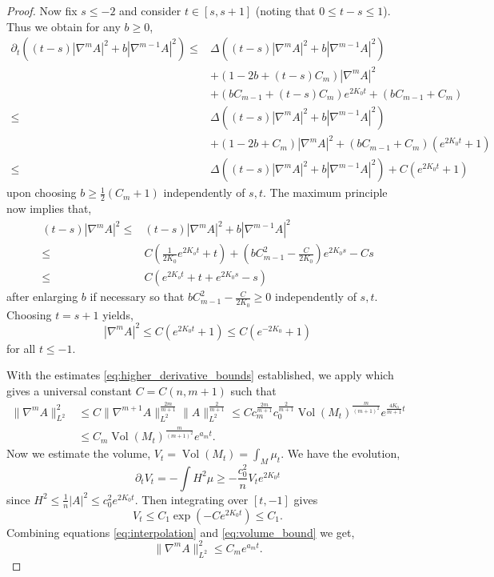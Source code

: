 \documentclass{amsart}
\begin{document}
\begin{proof}
Now fix \(s \leq -2\) and consider \(t \in [s, s+1]\) (noting that \(0 \leq t-s \leq 1\)). Thus we obtain for any \(b \geq 0\),
\begin{align*}
\partial_t ((t-s)|\nabla^m A|^2 + b|\nabla^{m-1} A|^2) \leq& \Delta((t-s)|\nabla^m A|^2 + b|\nabla^{m-1}A|^2) \\
&+ (1 - 2b + (t-s)C_m) |\nabla^m A|^2 \\
& + (bC_{m-1} + (t-s)C_m) e^{2K_0 t} + (bC_{m-1} + C_m) \\
\leq& \Delta((t-s)|\nabla^m A|^2 + b|\nabla^{m-1}A|^2) \\
&+ (1 - 2b + C_m) |\nabla^m A|^2 + (bC_{m-1} + C_m) (e^{2K_0 t} + 1) \\
\leq& \Delta((t-s)|\nabla^m A|^2 + b|\nabla^{m-1}A|^2) + C (e^{2K_0 t} + 1)
\end{align*}
upon choosing \(b \geq \tfrac{1}{2}(C_m + 1)\) independently of \(s, t\). The maximum principle now implies that,
\[
\begin{split}
(t-s) |\nabla^m A|^2 \leq& (t-s)|\nabla^m A|^2 + b|\nabla^{m-1} A|^2 \\
\leq& C\left(\frac{1}{2K_0} e^{2K_o t} + t\right) + \left(bC_{m-1}^2 - \frac{C}{2K_0}\right)e^{2K_0 s} - Cs \\
\leq& C(e^{2K_o t} + t + e^{2K_0 s} - s)
\end{split}
\]
after enlarging \(b\) if necessary so that \(bC_{m-1}^2 - \tfrac{C}{2K_0} \geq 0\) independently of \(s,t\). Choosing \(t = s + 1\) yields,
\[
|\nabla^m A|^2 \leq C (e^{2K_0t} + 1) \leq C(e^{-2K_0} + 1)
\]
for all \(t \leq -1\).

With the estimates \eqref{eq:higher_derivative_bounds} established, we apply \cite[12.7 Corollary]{Hamilton:/1982} which gives a universal constant \(C = C(n, m+1)\) such that
\begin{equation}
\label{eq:interpolation}
\begin{split}
\|\nabla^m A\|_{L^2}^2 &\leq C \|\nabla^{m+1} A\|_{L^2}^{\tfrac{2m}{m+1}} \|A\|_{L^2}^{\tfrac{2}{m+1}} \leq C c_m^{\tfrac{2m}{m+1}} c_0^{\tfrac{2}{m+1}} \operatorname{Vol}(M_t)^{\tfrac{m}{(m+1)^2}} e^{\tfrac{4K_0}{m+1}t} \\
&\leq C_m \operatorname{Vol}(M_t)^{\tfrac{m}{(m+1)^2}} e^{a_m t}.
\end{split}
\end{equation}
Now we estimate the volume, \(V_t = \operatorname{Vol}(M_t) = \int_M \mu_t\). We have the evolution,
\[
\partial_t V_t = -\int H^2 \mu \geq -\frac{c_0^2}{n} V_t e^{2K_0 t}
\]
since \(H^2 \leq \tfrac{1}{n} |A|^2 \leq c_0^2 e^{2K_0t}\). Then integrating over \([t, -1]\) gives
\begin{equation}
\label{eq:volume_bound}
V_t \leq C_1 \exp(-C e^{2K_0t}) \leq C_1.
\end{equation}
Combining equations \eqref{eq:interpolation} and \eqref{eq:volume_bound} we get,
\[
\|\nabla^m A\|_{L^2}^2 \leq C_m e^{a_m t}.
\]
\end{proof}

\printbibliography
\end{document}
